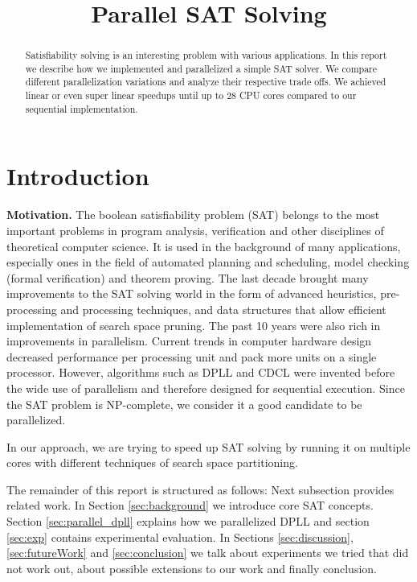 \documentclass[letterpaper]{article}
\title{Parallel SAT Solving}
\newcommand{\mypar}[1]{{\bf #1.}}
\begin{document}
%
\maketitle
%

\begin{abstract}
Satisfiability solving is an interesting problem with various applications.
In this report we describe how we implemented and parallelized a simple SAT solver.
We compare different parallelization variations and analyze their respective trade offs.
We achieved linear or even super linear speedups until up to 28 CPU cores compared to our sequential implementation.
\end{abstract}

\section{Introduction}\label{sec:intro}

\mypar{Motivation}
The boolean satisfiability problem (SAT) belongs to the most important problems in program analysis, verification and other disciplines of theoretical computer science.
It is used in the background of many applications, especially ones in the field of automated planning and scheduling, model checking (formal verification) and theorem proving.
The last decade brought many improvements to the SAT solving world in the form of advanced heuristics, pre-processing and processing techniques, and data structures that allow efficient implementation of search space pruning.
The past 10 years were also rich in improvements in parallelism.
Current trends in computer hardware design decreased performance per processing unit and pack more units on a single processor.
However, algorithms such as DPLL and CDCL were invented before the wide use of parallelism and therefore designed for sequential execution.
Since the SAT problem is NP-complete, we consider it a good candidate to be parallelized.

In our approach, we are trying to speed up SAT solving by running it on multiple cores with different techniques of search space partitioning.

The remainder of this report is structured as follows:
Next subsection provides related work.
In Section \ref{sec:background} we introduce core SAT concepts.
Section \ref{sec:parallel_dpll} explains how we parallelized DPLL and section \ref{sec:exp} contains experimental evaluation.
In Sections \ref{sec:discussion}, \ref{sec:futureWork} and \ref{sec:conclusion} we talk about experiments we tried that did not work out, about possible extensions to our work and finally conclusion.
\end{document}
